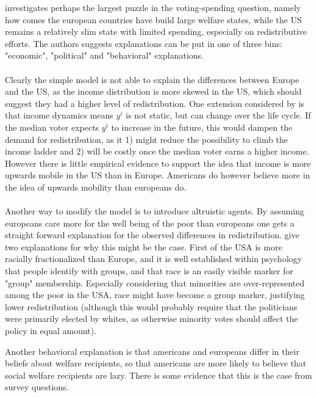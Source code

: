 \cite{alesina_why_2001} investigates perhaps the largest puzzle in the voting-spending question, namely how comes the european countries have build large welfare states, while the US remains a relatively slim state with limited spending, especially on redistributive efforts. The authors suggests explanations can be put in one of three bins: "economic", "political" and "behavioral" explanations. 
\\ \\ 
Clearly the simple model is not able to explain the differences between Europe and the US, as the income distribution is more skewed in the US, which should suggest they had a higher level of redistribution. One extension considered by \citeauthor{alesina_why_2001} is that income dynamics means $y^i$ is not static, but can change over the life cycle. If the median voter expects $y^i$ to increase in the future, this would dampen the demand for redistribution, as it 1) might reduce the possibility to climb the income ladder and 2) will be costly once the median voter earns a higher income. However there is little empirical evidence to support the idea that income is more upwards mobile in the US than in Europe. Americans do however believe more in the idea of upwards mobility than europeans do. 
\\ \\ 
Another way to modify the model is to introduce altruistic agents. By assuming europeans care more for the well being of the poor than europeans one gets a straight forward explanation for the observed differences in redistribution. \citeauthor{alesina_why_2001} give two explanations for why this might be the case. First of the USA is more racially fractionalized than Europe, and it is well established within psychology that people identify with groups, and that race is an easily visible marker for "group" membership. Especially considering that minorities are over-represented among the poor in the USA, race might have become a group marker, justifying lower redistribution (although this would probably require that the politicians were primarily elected by whites, as otherwise minority votes should affect the policy in equal amount). 

Another behavioral explanation is that americans and europeans differ in their beliefs about welfare recipients, so that americans are more likely to believe that social welfare recipients are lazy. There is some evidence that this is the case from survey questions.

